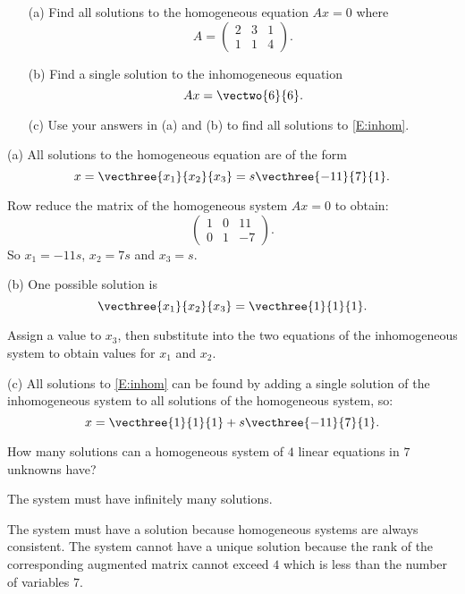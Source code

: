 \documentclass{article}
\begin{document}
\begin{exercise} \label{c4.4.3}
\begin{itemize}
\item[(a)] Find all solutions to the homogeneous equation
$Ax=0$ where
\[
A = \left(\begin{array}{ccc} 2 & 3 & 1 \\ 1 & 1 & 4 \end{array}
\right).
\]
\item[(b)] Find a single solution to the inhomogeneous equation
\begin{equation}  \label{E:inhom}
Ax =\vectwo{6}{6}.
\end{equation}
\item[(c)] Use your answers in (a) and (b) to find all solutions
to \eqref{E:inhom}.
\end{itemize}

\begin{solution}

(a) \ans All solutions to the homogeneous equation are of the form
\[
x = \vecthree{x_1}{x_2}{x_3} = s\vecthree{-11}{7}{1}.
\]

\soln Row reduce the matrix of the homogeneous system
$Ax = 0$ to obtain:
\[
\left(\begin{array}{rrr} 1 & 0 & 11 \\ 0 & 1 & -7 \end{array}\right).
\]
So $x_1 = -11s$, $x_2 = 7s$ and $x_3 = s$.

(b) \ans One possible solution is
\[ \vecthree{x_1}{x_2}{x_3} = \vecthree{1}{1}{1}. \]

\soln Assign a value to $x_3$, then substitute into the two equations
of the inhomogeneous system to obtain values for $x_1$ and $x_2$.

(c) All solutions to \eqref{E:inhom} can be found by adding a
single solution of the inhomogeneous system to all solutions
of the homogeneous system, so:
\[
x = \vecthree{1}{1}{1} + s\vecthree{-11}{7}{1}.
\]
\end{solution}
\end{exercise}





\problemlabel

\begin{exercise} \label{A.3.4.1}
How many solutions can a homogeneous system of $4$ linear equations in $7$ unknowns have?

\begin{solution}
\ans The system must have infinitely many solutions.

The system must have a solution because homogeneous systems are always consistent.
The system cannot have a unique solution because the rank of the corresponding augmented matrix cannot exceed $4$ which is less than the number of variables $7$.
\end{solution}
\end{exercise}
\end{document}
